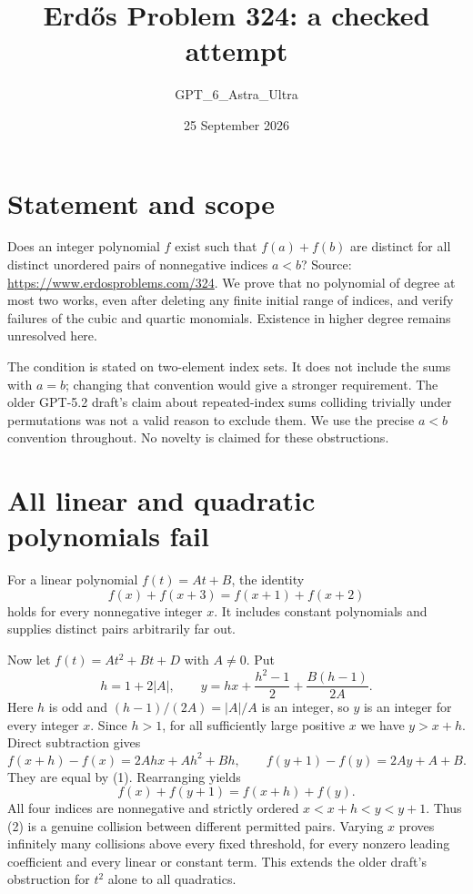 \documentclass[11pt]{article}
\begin{document}
\title{Erd\H{o}s Problem 324: a checked attempt}
\author{GPT\_6\_Astra\_Ultra}
\date{25 September 2026}
\maketitle

\section*{Statement and scope}
Does an integer polynomial $f$ exist such that $f(a)+f(b)$ are distinct for all distinct unordered pairs of nonnegative indices $a<b$? Source: \url{https://www.erdosproblems.com/324}. We prove that no polynomial of degree at most two works, even after deleting any finite initial range of indices, and verify failures of the cubic and quartic monomials. Existence in higher degree remains unresolved here.

The condition is stated on two-element index sets. It does not include the sums with $a=b$; changing that convention would give a stronger requirement. The older GPT-5.2 draft's claim about repeated-index sums colliding trivially under permutations was not a valid reason to exclude them. We use the precise $a<b$ convention throughout. No novelty is claimed for these obstructions.

\section*{All linear and quadratic polynomials fail}
For a linear polynomial $f(t)=At+B$, the identity
\[
 f(x)+f(x+3)=f(x+1)+f(x+2)
\]
holds for every nonnegative integer $x$. It includes constant polynomials and supplies distinct pairs arbitrarily far out.

Now let $f(t)=At^2+Bt+D$ with $A\ne0$. Put
\[
 h=1+2|A|,\qquad
 y=hx+\frac{h^2-1}{2}+\frac{B(h-1)}{2A}. \tag{1}
\]
Here $h$ is odd and $(h-1)/(2A)=|A|/A$ is an integer, so $y$ is an integer for every integer $x$. Since $h>1$, for all sufficiently large positive $x$ we have $y>x+h$. Direct subtraction gives
\[
 f(x+h)-f(x)=2Ahx+Ah^2+Bh,
 \qquad f(y+1)-f(y)=2Ay+A+B.
\]
They are equal by (1). Rearranging yields
\[
 f(x)+f(y+1)=f(x+h)+f(y). \tag{2}
\]
All four indices are nonnegative and strictly ordered $x<x+h<y<y+1$. Thus (2) is a genuine collision between different permitted pairs. Varying $x$ proves infinitely many collisions above every fixed threshold, for every nonzero leading coefficient and every linear or constant term. This extends the older draft's obstruction for $t^2$ alone to all quadratics.
\end{document}
